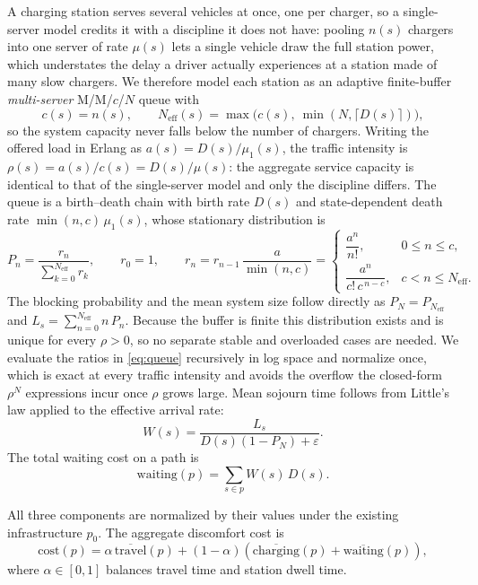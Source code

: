 \documentclass[graybox]{svmult}
\begin{document}
A charging station serves several vehicles at once, one per charger, so a
single-server model credits it with a discipline it does not have: pooling
$n(s)$ chargers into one server of rate $\mu(s)$ lets a single vehicle draw the
full station power, which understates the delay a driver actually experiences at
a station made of many slow chargers. We therefore model each station as an
adaptive finite-buffer \emph{multi-server} M/M/$c$/$N$ queue with
\begin{equation}
\label{eq:neff}
c(s)=n(s),
\qquad
N_{\mathrm{eff}}(s)=\max\bigl(c(s),\ \min(N,\lceil D(s)\rceil)\bigr),
\end{equation}
so the system capacity never falls below the number of chargers. Writing the
offered load in Erlang as $a(s)=D(s)/\mu_1(s)$, the traffic intensity is
$\rho(s)=a(s)/c(s)=D(s)/\mu(s)$: the aggregate service capacity is identical to
that of the single-server model and only the discipline differs. The queue is a
birth--death chain with birth rate $D(s)$ and state-dependent death rate
$\min(n,c)\,\mu_1(s)$, whose stationary distribution is
\begin{equation}
\label{eq:queue}
P_n=\frac{r_n}{\sum_{k=0}^{N_{\mathrm{eff}}}r_k},
\qquad
r_0=1,
\qquad
r_n=r_{n-1}\,\frac{a}{\min(n,c)}
=
\begin{cases}
\dfrac{a^{n}}{n!}, & 0\le n\le c,\\
\dfrac{a^{n}}{c!\,c^{\,n-c}}, & c< n\le N_{\mathrm{eff}}.
\end{cases}
\end{equation}
The blocking probability and the mean system size follow directly as
$P_N=P_{N_{\mathrm{eff}}}$ and $L_s=\sum_{n=0}^{N_{\mathrm{eff}}}n\,P_n$. Because
the buffer is finite this distribution exists and is unique for every $\rho>0$,
so no separate stable and overloaded cases are needed. We evaluate the ratios in
\eqref{eq:queue} recursively in log space and normalize once, which is exact at
every traffic intensity and avoids the overflow the closed-form $\rho^{N}$
expressions incur once $\rho$ grows large.
Mean sojourn time follows from Little’s law applied to the effective arrival rate:
\begin{equation}
W(s)=\frac{L_s}{D(s)(1-P_N)+\varepsilon}.
\end{equation}
The total waiting cost on a path is
\begin{equation}
\label{eq:waiting}
\mathrm{waiting}(p)=\sum_{s\in p}W(s)\,D(s).
\end{equation}

All three components are normalized by their values under the existing infrastructure $p_0$. The aggregate discomfort cost is
\begin{equation}
\label{eq:cost}
\mathrm{cost}(p)
=
\alpha\,\overline{\mathrm{travel}}(p)
+
(1-\alpha)
\left(
\overline{\mathrm{charging}}(p)
+
\overline{\mathrm{waiting}}(p)
\right),
\end{equation}
where $\alpha \in [0,1]$ balances travel time and station dwell time.
\end{document}

